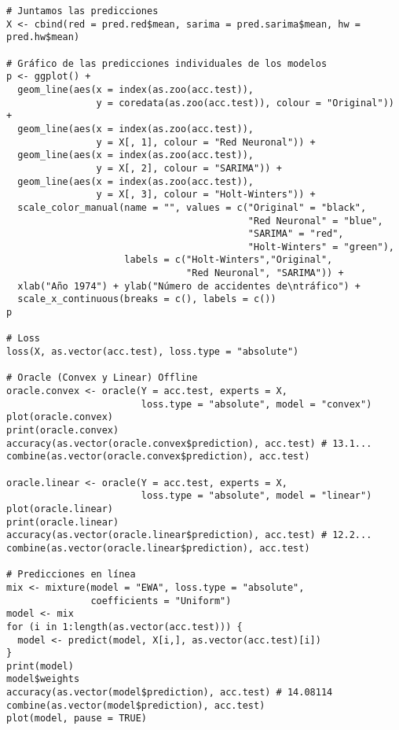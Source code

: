 \documentclass[12pt,a4paper,oneside]{article}
\begin{document}
\begin{Verbatim}[fontsize=\footnotesize]
# Juntamos las predicciones
X <- cbind(red = pred.red$mean, sarima = pred.sarima$mean, hw = pred.hw$mean)

# Gráfico de las predicciones individuales de los modelos
p <- ggplot() +
  geom_line(aes(x = index(as.zoo(acc.test)),
                y = coredata(as.zoo(acc.test)), colour = "Original")) +
  geom_line(aes(x = index(as.zoo(acc.test)),
                y = X[, 1], colour = "Red Neuronal")) +
  geom_line(aes(x = index(as.zoo(acc.test)),
                y = X[, 2], colour = "SARIMA")) +
  geom_line(aes(x = index(as.zoo(acc.test)),
                y = X[, 3], colour = "Holt-Winters")) +
  scale_color_manual(name = "", values = c("Original" = "black",
                                           "Red Neuronal" = "blue",
                                           "SARIMA" = "red",
                                           "Holt-Winters" = "green"),
                     labels = c("Holt-Winters","Original",
                                "Red Neuronal", "SARIMA")) +
  xlab("Año 1974") + ylab("Número de accidentes de\ntráfico") +
  scale_x_continuous(breaks = c(), labels = c())
p

# Loss
loss(X, as.vector(acc.test), loss.type = "absolute")

# Oracle (Convex y Linear) Offline
oracle.convex <- oracle(Y = acc.test, experts = X,
                        loss.type = "absolute", model = "convex")
plot(oracle.convex)
print(oracle.convex)
accuracy(as.vector(oracle.convex$prediction), acc.test) # 13.1...
combine(as.vector(oracle.convex$prediction), acc.test)

oracle.linear <- oracle(Y = acc.test, experts = X,
                        loss.type = "absolute", model = "linear")
plot(oracle.linear)
print(oracle.linear)
accuracy(as.vector(oracle.linear$prediction), acc.test) # 12.2...
combine(as.vector(oracle.linear$prediction), acc.test)

# Predicciones en línea
mix <- mixture(model = "EWA", loss.type = "absolute",
               coefficients = "Uniform")
model <- mix
for (i in 1:length(as.vector(acc.test))) {
  model <- predict(model, X[i,], as.vector(acc.test)[i])
}
print(model)
model$weights
accuracy(as.vector(model$prediction), acc.test) # 14.08114
combine(as.vector(model$prediction), acc.test)
plot(model, pause = TRUE)
\end{Verbatim}
\end{document}
